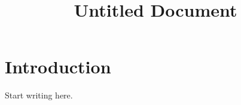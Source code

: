 \documentclass[11pt,a4paper]{article}
\title{Untitled Document}
\author{}
\date{}
\begin{document}
\maketitle

\section{Introduction}

Start writing here.
\end{document}
